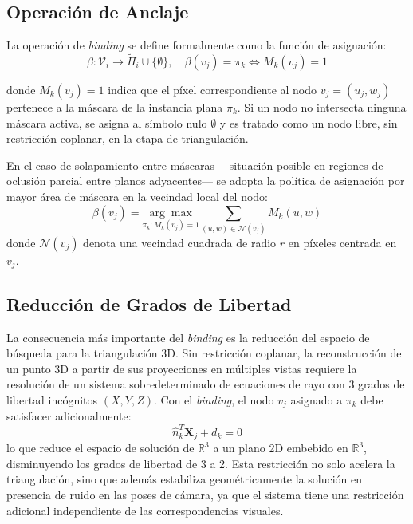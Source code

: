\subsection{Operación de Anclaje}
 
La operación de \textit{binding} se define formalmente como la función de asignación:
\begin{equation}
    \beta: \mathcal{V}_i \rightarrow \tilde{\Pi}_i \cup \{\emptyset\}, \quad \beta(v_j) = \pi_k \iff M_k(v_j) = 1
\end{equation}
 
donde $M_k(v_j) = 1$ indica que el píxel correspondiente al nodo $v_j = (u_j, w_j)$ pertenece a la máscara de la instancia plana $\pi_k$. Si un nodo no intersecta ninguna máscara activa, se asigna al símbolo nulo $\emptyset$ y es tratado como un nodo libre, sin restricción coplanar, en la etapa de triangulación.
 
En el caso de solapamiento entre máscaras —situación posible en regiones de oclusión parcial entre planos adyacentes— se adopta la política de asignación por mayor área de máscara en la vecindad local del nodo:
\begin{equation}
    \beta(v_j) = \underset{\pi_k : M_k(v_j)=1}{\arg\max} \sum_{(u,w) \in \mathcal{N}(v_j)} M_k(u,w)
\end{equation}
donde $\mathcal{N}(v_j)$ denota una vecindad cuadrada de radio $r$ en píxeles centrada en $v_j$.
 
\subsection{Reducción de Grados de Libertad}
 
La consecuencia más importante del \textit{binding} es la reducción del espacio de búsqueda para la triangulación 3D. Sin restricción coplanar, la reconstrucción de un punto 3D a partir de sus proyecciones en múltiples vistas requiere la resolución de un sistema sobredeterminado de ecuaciones de rayo con 3 grados de libertad incógnitos $(X, Y, Z)$. Con el \textit{binding}, el nodo $v_j$ asignado a $\pi_k$ debe satisfacer adicionalmente:
\begin{equation}
    \hat{n}_k^T \mathbf{X}_j + d_k = 0
\end{equation}
lo que reduce el espacio de solución de $\mathbb{R}^3$ a un plano 2D embebido en $\mathbb{R}^3$, disminuyendo los grados de libertad de 3 a 2. Esta restricción no solo acelera la triangulación, sino que además estabiliza geométricamente la solución en presencia de ruido en las poses de cámara, ya que el sistema tiene una restricción adicional independiente de las correspondencias visuales.

